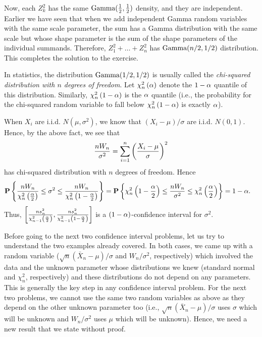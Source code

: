 \documentclass[preprint,  11pt]{amsart}
\def\half{\frac{1}{2}}
\def\sig{{\sigma}}
\begin{document}
Now, each $Z_{k}^{2}$ has the same $\mb{Gamma}(\half,\half)$ density, and they are independent. Earlier we have seen that when we add independent Gamma random variables with the same scale parameter, the sum has a Gamma distribution with the same scale but whose shape parameter is the sum of the shape parameters of the individual summands. Therefore, $Z_{1}^{2}+\ldots +Z_{n}^{2}$ has $\mbox{Gamma}(n/2,1/2)$ distribution. This completes the solution to the exercise.

\medskip


In statistics, the distribution $\mbox{Gamma}(1/2,1/2)$ is usually called the {\em chi-squared distribution with $n$ degrees of freedom}. Let $\chi_{n}^{2}\left(\alpha\right)$ denote the $1-\alpha$ quantile of this distribution. Similarly, $\chi_{n}^{2}\left(1-\alpha\right)$ is the $\alpha$ quantile (i.e., the probability for the chi-squared random variable to fall below $\chi_{n}^{2}\left(1-\alpha\right)$ is exactly $\alpha$).

When $X_{i}$ are i.i.d. $N(\mu,\sig^{2})$, we know that $(X_{i}-\mu)/\sig$ are i.i.d. $N(0,1)$. Hence, by the above fact, we see that
$$
 \frac{nW_{n}}{\sig^{2}}=\sum_{i=1}^{n}\l(\frac{X_{i}-\mu}{\sig}\r)^{2}
$$
has chi-squared distribution with $n$ degrees of freedom. Hence
\begin{align*}
\P\l\{   \frac{nW_{n}}{\chi_{n}^{2}\l(\frac{\alp}{2}\r)} \le \sig^{2}\le \frac{nW_{n}}{\chi_{n}^{2}\l(1-\frac{\alp}{2}\r)}\r\}&=\P\l\{ \chi_{n}^{2}\l(1-\frac{\alp}{2}\r) \le \frac{nW_{n}}{\sig^{2}} \le \chi_{n}^{2}\l(\frac{\alp}{2}\r)\r\}=1-\alp.
\end{align*}
 Thus, $\left[\frac{ns_{n}^{2}}{\chi_{n-1}^{2}\left(\frac{\alpha}{2}\right)},\frac{ns_{n}^{2}}{\chi_{n-1}^{2}\left(1-\frac{\alpha}{2}\right)}\right]$ is a $(1-\alpha)$-confidence interval for $\sig^{2}$.

 Before going to the next two confidence interval problems, let us try to understand the two examples already covered. In both cases, we came up with a random variable ($\sqrt{n}(\bar{X}_{n}-\mu)/\sig$ and $W_{n}/\sig^{2}$, respectively) which involved the data and the unknown parameter  whose distributions we knew (standard normal and $\chi^{2}_{n}$, respectively) and these distributions do not depend on any parameters. This is generally the key step in any confidence interval problem. For the next two problems, we cannot use the same two random variables as above as they depend on the other unknown parameter too (i.e.,  $\sqrt{n}(\bar{X}_{n}-\mu)/\sig$ uses $\sig$ which will be unknown and $W_{n}/\sig^{2}$ uses $\mu$ which will be unknown). Hence, we need a new result that we state without proof.
\end{document}
